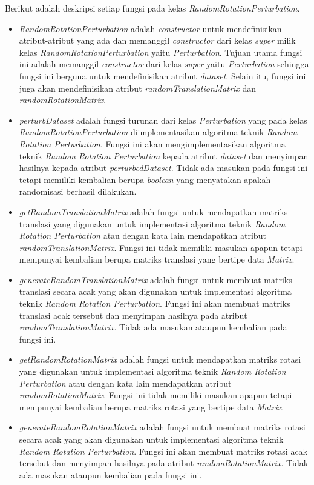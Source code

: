 Berikut adalah deskripsi setiap fungsi pada kelas \textit{RandomRotationPerturbation}.
\begin{itemize}
	\item \textit{RandomRotationPerturbation} adalah \textit{constructor} untuk mendefinisikan atribut-atribut yang ada dan memanggil \textit{constructor} dari kelas \textit{super} milik kelas \textit{RandomRotationPerturbation} yaitu \textit{Perturbation}. Tujuan utama fungsi ini adalah memanggil \textit{constructor} dari kelas \textit{super} yaitu \textit{Perturbation} sehingga fungsi ini berguna untuk mendefinisikan atribut \textit{dataset}. Selain itu, fungsi ini juga akan mendefinisikan atribut \textit{randomTranslationMatrix} dan \textit{randomRotationMatrix}.
	\item \textit{perturbDataset} adalah fungsi turunan dari kelas \textit{Perturbation} yang pada kelas \textit{RandomRotationPerturbation} diimplementasikan algoritma teknik \textit{Random Rotation Perturbation}. Fungsi ini akan mengimplementasikan algoritma teknik \textit{Random Rotation Perturbation} kepada atribut \textit{dataset} dan menyimpan hasilnya kepada atribut \textit{perturbedDataset}. Tidak ada masukan pada fungsi ini tetapi memiliki kembalian berupa \textit{boolean} yang menyatakan apakah randomisasi berhasil dilakukan.
	\item \textit{getRandomTranslationMatrix} adalah fungsi untuk mendapatkan matriks translasi yang digunakan untuk implementasi algoritma teknik \textit{Random Rotation Perturbation} atau dengan kata lain mendapatkan atribut \textit{randomTranslationMatrix}. Fungsi ini tidak memiliki masukan apapun tetapi mempunyai kembalian berupa matriks translasi yang bertipe data \textit{Matrix}.
	\item \textit{generateRandomTranslationMatrix} adalah fungsi untuk membuat matriks translasi secara acak yang akan digunakan untuk implementasi algoritma teknik \textit{Random Rotation Perturbation}. Fungsi ini akan membuat matriks translasi acak tersebut dan menyimpan hasilnya pada atribut \textit{randomTranslationMatrix}. Tidak ada masukan ataupun kembalian pada fungsi ini.
	\item \textit{getRandomRotationMatrix} adalah fungsi untuk mendapatkan matriks rotasi yang digunakan untuk implementasi algoritma teknik \textit{Random Rotation Perturbation} atau dengan kata lain mendapatkan atribut \textit{randomRotationMatrix}. Fungsi ini tidak memiliki masukan apapun tetapi mempunyai kembalian berupa matriks rotasi yang bertipe data \textit{Matrix}.
	\item \textit{generateRandomRotationMatrix} adalah fungsi untuk membuat matriks rotasi secara acak yang akan digunakan untuk implementasi algoritma teknik \textit{Random Rotation Perturbation}. Fungsi ini akan membuat matriks rotasi acak tersebut dan menyimpan hasilnya pada atribut \textit{randomRotationMatrix}. Tidak ada masukan ataupun kembalian pada fungsi ini.
\end{itemize}

